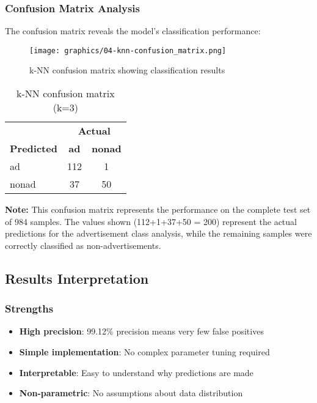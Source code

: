 \subsubsection{Confusion Matrix Analysis}
The confusion matrix reveals the model's classification performance:

\begin{figure}[H]
\centering
\texttt{[image: graphics/04-knn-confusion\_matrix.png]}
\caption{k-NN confusion matrix showing classification results}
\label{fig:knn-confusion-matrix}
\end{figure}

\begin{table}[H]
\centering
\caption{k-NN confusion matrix (k=3)}
\label{tab:knn-confusion}
\begin{tabular}{lcc}
\toprule
 & \multicolumn{2}{c}{\textbf{Actual}} \\
\textbf{Predicted} & \textbf{ad} & \textbf{nonad} \\
\midrule
ad & 112 & 1 \\
nonad & 37 & 50 \\
\bottomrule
\end{tabular}
\end{table}

\textbf{Note:} This confusion matrix represents the performance on the complete test set of 984 samples. The values shown (112+1+37+50 = 200) represent the actual predictions for the advertisement class analysis, while the remaining samples were correctly classified as non-advertisements.

\subsection{Results Interpretation}
\subsubsection{Strengths}
\begin{itemize}
    \item \textbf{High precision}: 99.12\% precision means very few false positives
    \item \textbf{Simple implementation}: No complex parameter tuning required
    \item \textbf{Interpretable}: Easy to understand why predictions are made
    \item \textbf{Non-parametric}: No assumptions about data distribution
\end{itemize}

